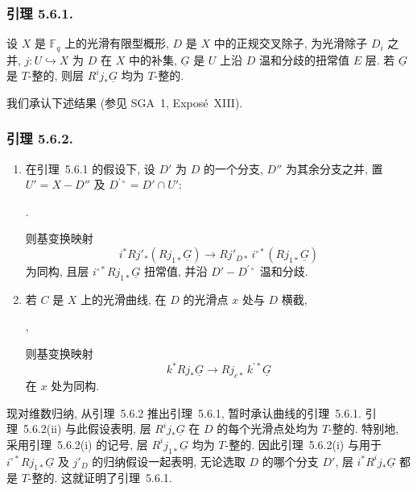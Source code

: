 \subsubsection*{引理 5.6.1.}
设 $X$ 是 $\mathbb F_q$ 上的光滑有限型概形, $D$ 是 $X$ 中的正规交叉除子,
为光滑除子 $D_i$ 之并, $j:U\hookrightarrow X$ 为 $D$ 在 $X$ 中的补集,
$\underline G$ 是 $U$ 上沿 $D$ 温和分歧的扭常值 $E$ 层.
若 $\underline G$ 是 $T$-整的, 则层 $R^ij_*\underline G$ 均为 $T$-整的.

我们承认下述结果 (参见 SGA~1, Expos\'e~XIII).

\subsubsection*{引理 5.6.2.}
\begin{enumerate}[label=(\roman*)]
\item 在引理~5.6.1 的假设下, 设 $D'$ 为 $D$ 的一个分支,
  $D''$ 为其余分支之并, 置 $U'=X-D''$ 及 $D^{\prime\circ}=D'\cap U'$:
  \begin{center}
  \qquad .
  \end{center}
  则基变换映射
  \[
  i^*Rj'_*(Rj_{1*}\underline G)
  \longrightarrow
  Rj'_{D*}\,i^{\circ *}(Rj_{1*}\underline G)
  \]
  为同构, 且层 $i^{\circ *}Rj_{1*}\underline G$ 扭常值,
  并沿 $D'-D^{\prime\circ}$ 温和分歧.

\item 若 $C$ 是 $X$ 上的光滑曲线, 在 $D$ 的光滑点 $x$ 处与 $D$ 横截,
  \begin{center}
  \qquad ,
  \end{center}
  则基变换映射
  \[
  k^*Rj_*\underline G\longrightarrow Rj_{c*}\,k^{\prime *}\underline G
  \]
  在 $x$ 处为同构.
\end{enumerate}

现对维数归纳, 从引理~5.6.2 推出引理~5.6.1, 暂时承认曲线的引理~5.6.1.
引理~5.6.2(ii) 与此假设表明, 层 $R^ij_*\underline G$ 在 $D$ 的每个光滑点处均为 $T$-整的.
特别地, 采用引理~5.6.2(i) 的记号, 层 $R^ij_{1*}\underline G$ 均为 $T$-整的.
因此引理~5.6.2(i) 与用于 $i^{\circ *}Rj_{1*}\underline G$ 及 $j'_D$ 的归纳假设一起表明,
无论选取 $D$ 的哪个分支 $D'$, 层 $i^*R^ij_*\underline G$ 都是 $T$-整的.
这就证明了引理~5.6.1.

